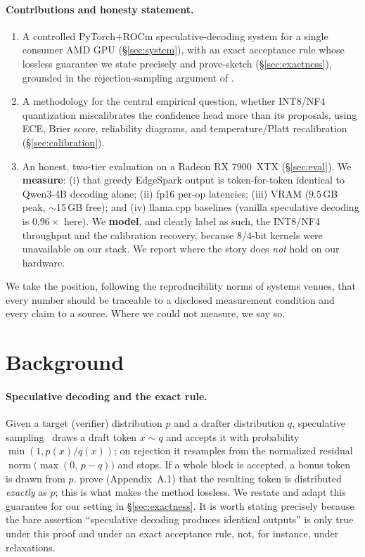 \documentclass[11pt]{article}
\theoremstyle{plain}
\theoremstyle{definition}
\begin{document}
\paragraph{Contributions and honesty statement.}
\begin{enumerate}\itemsep2pt
\item A controlled PyTorch+ROCm speculative-decoding system for a single consumer
AMD GPU (\S\ref{sec:system}), with an exact acceptance rule whose lossless
guarantee we state precisely and prove-sketch (\S\ref{sec:exactness}), grounded
in the rejection-sampling argument of \citet{leviathan2023}.
\item A methodology for the central empirical question, whether INT8/NF4
quantization miscalibrates the confidence head more than its
proposals, using ECE, Brier score, reliability diagrams, and
temperature/Platt recalibration (\S\ref{sec:calibration}).
\item An honest, two-tier evaluation on a Radeon RX 7900~XTX
(\S\ref{sec:eval}). We \textbf{measure}: (i) that greedy EdgeSpark output is
token-for-token identical to Qwen3-4B decoding alone; (ii) fp16 per-op
latencies; (iii) VRAM ($9.5$\,GB peak, $\sim$15\,GB free); and (iv) llama.cpp
baselines (vanilla speculative decoding is $0.96\times$ here). We
\textbf{model}, and clearly label as such, the INT8/NF4 throughput and the
calibration recovery, because 8/4-bit kernels were unavailable on our stack. We
report where the story does \emph{not} hold on our hardware.
\end{enumerate}

We take the position, following the reproducibility norms of systems venues, that
every number should be traceable to a disclosed measurement condition and every
claim to a source. Where we could not measure, we say so.

\section{Background}
\paragraph{Speculative decoding and the exact rule.}
Given a target (verifier) distribution $p$ and a drafter distribution $q$,
speculative sampling~\citep{leviathan2023,chen2023} draws a draft token
$x\sim q$ and accepts it with probability $\min\!\left(1, p(x)/q(x)\right)$; on
rejection it resamples from the normalized residual
$\operatorname{norm}\!\big(\max(0,\,p-q)\big)$ and stops. If a whole block is
accepted, a bonus token is drawn from $p$. \citet{leviathan2023} prove
(Appendix~A.1) that the resulting token is distributed \emph{exactly} as $p$;
this is what makes the method lossless. We restate and adapt this guarantee for
our setting in \S\ref{sec:exactness}. It is worth stating precisely because the
bare assertion ``speculative decoding produces identical outputs'' is only true
under this proof and under an exact acceptance rule, not, for instance, under
relaxations.
\end{document}

